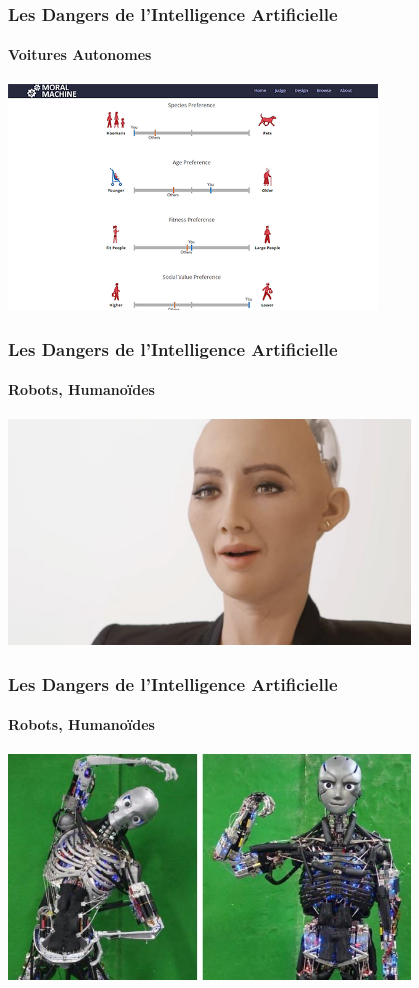 \documentclass{beamer}
\begin{document}
	\begin{frame}[fragile]
	\frametitle{Les Dangers de l'Intelligence Artificielle}
	\framesubtitle{Voitures Autonomes}
	\centerline{\includegraphics[height=6cm]{MIT2.png}}
	\end{frame}
	
	\begin{frame}[fragile]
	\frametitle{Les Dangers de l'Intelligence Artificielle}
	\framesubtitle{Robots, Humanoïdes}
	\centerline{\includegraphics[height=6cm]{robotSophia.jpeg}}
	\end{frame}
	
	\begin{frame}[fragile]
	\frametitle{Les Dangers de l'Intelligence Artificielle}
	\framesubtitle{Robots, Humanoïdes}
	\centerline{\includegraphics[height=6cm]{kenshiro_kengoro.jpg}}
	\end{frame}
	
\end{document}
